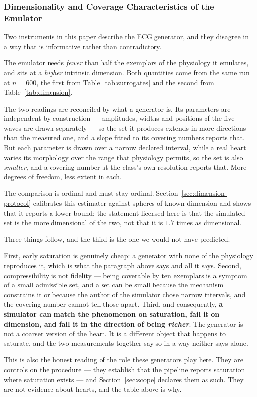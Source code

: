 \documentclass[10pt]{article}
\theoremstyle{plain}
\theoremstyle{definition}
\theoremstyle{remark}
\begin{document}
\subsubsection{Dimensionality and Coverage Characteristics of the Emulator}
\label{sec:ecg-sim-geometry}

Two instruments in this paper describe the ECG generator, and they disagree in
a way that is informative rather than contradictory.

\begin{center}\small

\end{center}

The emulator needs \emph{fewer} than half the exemplars of the physiology it
emulates, and sits at a \emph{higher} intrinsic dimension. Both quantities come
from the same run at $n=600$, the first from
Table~\ref{tab:surrogates} and the second from Table~\ref{tab:dimension}.

The two readings are reconciled by what a generator is. Its parameters are
independent by construction --- amplitudes, widths and positions of the five
waves are drawn separately --- so the set it produces extends in more
directions than the measured one, and a slope fitted to its covering numbers
reports that. But each parameter is drawn over a narrow declared interval,
while a real heart varies its morphology over the range that physiology
permits, so the set is also \emph{smaller}, and a covering number at the class's
own resolution reports that. More degrees of freedom, less extent in each.

The comparison is ordinal and must stay ordinal. Section~\ref{sec:dimension-protocol}
calibrates this estimator against spheres of known dimension and shows that it
reports a lower bound; the statement licensed here is that the simulated set is
the more dimensional of the two, not that it is $1.7$ times as dimensional.

Three things follow, and the third is the one we would not have predicted.

First, early saturation is genuinely cheap: a generator with none of the
physiology reproduces it, which is what the paragraph above says and all it
says. Second, compressibility is not fidelity --- being coverable by ten
exemplars is a symptom of a small admissible set, and a set can be small
because the mechanism constrains it or because the author of the simulator
chose narrow intervals, and the covering number cannot tell those apart.
Third, and consequently, \textbf{a simulator can match the phenomenon on
saturation, fail it on dimension, and fail it in the direction of being
\emph{richer}}. The generator is not a coarser version of the heart. It is a
different object that happens to saturate, and the two measurements together
say so in a way neither says alone.

This is also the honest reading of the role these generators play here. They
are controls on the procedure --- they establish that the pipeline reports
saturation where saturation exists --- and Section~\ref{sec:scope} declares them
as such. They are not evidence about hearts, and the table above is why.
\end{document}
